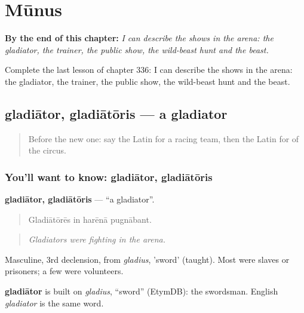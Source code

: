 
\chapter{Mūnus}
\label{ch:la-munus}

\begin{chapteropening}
\textbf{By the end of this chapter:} \emph{I can describe the shows in the arena: the gladiator, the trainer, the public show, the wild-beast hunt and the beast.}

Complete the last lesson of chapter 336: I can describe the shows in the arena: the gladiator, the trainer, the public show, the wild-beast hunt and the beast.
\end{chapteropening}

\section[gladiātor, gladiātōris]{gladiātor, gladiātōris — a gladiator}

\label{lesson:LA-C336-gladiator}



\begin{quote}
Before the new one: say the Latin for a racing team, then the Latin for of the circus.
\end{quote}

\subsection*{You'll want to know: gladiātor, gladiātōris}
\textbf{gladiātor, gladiātōris} — \textquotedblleft{}a gladiator\textquotedblright{}.

\begin{quote}
Gladiātōrēs in harēnā pugnābant.
\end{quote}

\begin{quote}
\emph{Gladiators were fighting in the arena.}
\end{quote}

Masculine, 3rd declension, from \emph{gladius}, 'sword' (taught). Most were slaves or prisoners; a few were volunteers.

\begin{cousinweb}
\textbf{gladiātor} is built on \emph{gladius}, \textquotedblleft{}sword\textquotedblright{} (EtymDB): the swordsman. English \emph{gladiator} is the same word.
\end{cousinweb}

